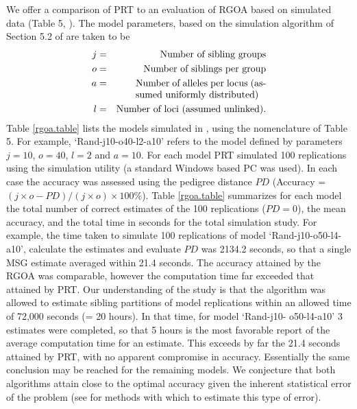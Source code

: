 \documentclass[twoside,10pt,twocolumn]{article}
\begin{document}
We offer a comparison of PRT to an evaluation of RGOA based on simulated data (Table 5, \cite{Chou2012}). 
The model parameters, based on the simulation algorithm of Section 5.2 of \cite{Chou2012}  are taken to be
\begin{eqnarray*}
j & = & \mbox{Number of sibling groups} \\
o & = & \mbox{Number of siblings per group} \\
a & = & \parbox[t]{.395\textwidth}{Number of alleles per locus (assumed uniformly distributed)}\\
l & = & \mbox{Number of loci (assumed unlinked)}. 
\end{eqnarray*}
Table \ref{rgoa.table} lists the models simulated in \citet{Chou2012}, using the nomenclature of Table 5. 
For example, `Rand-j10-o40-l2-a10' refers to the model defined by parameters $j = 10$, $o = 40$, $l = 2$ and 
$a = 10$. For each model PRT simulated 100 replications using the simulation utility \cite{alm&and11} (a 
standard Windows based PC was used). In each case the accuracy was assessed using the pedigree distance $PD$ 
(Accuracy = $(j\times o - PD)/(j \times o) \times 100\%$). Table \ref{rgoa.table} summarizes for each model 
the total number of correct estimates of the 100 replications ($PD = 0$), the mean accuracy, and the total 
time in seconds for the total simulation study. For example, the time taken to simulate 100 replications of 
model `Rand-j10-o50-l4-a10', calculate the estimates and evaluate $PD$ was 2134.2 seconds, so that a single 
MSG estimate averaged within 21.4 seconds. 
The accuracy attained by the RGOA was comparable, however the computation time far exceeded that attained by 
PRT. Our understanding of the study is that the algorithm was allowed to estimate sibling partitions of 
model replications within an allowed time of 72,000 seconds (= 20 hours). In that time, for model `Rand-j10-
o50-l4-a10' 3 estimates were completed, so that 5 hours is the most favorable report of the average 
computation time for an estimate. This exceeds by far the 21.4 seconds attained by PRT, with no apparent 
compromise in accuracy. Essentially the same conclusion may be reached for the remaining models. We 
conjecture that both algorithms attain close to the optimal accuracy given the inherent statistical error of 
the problem (see \cite{almudevar99} for methods with which to estimate this type of error).        
\end{document}
